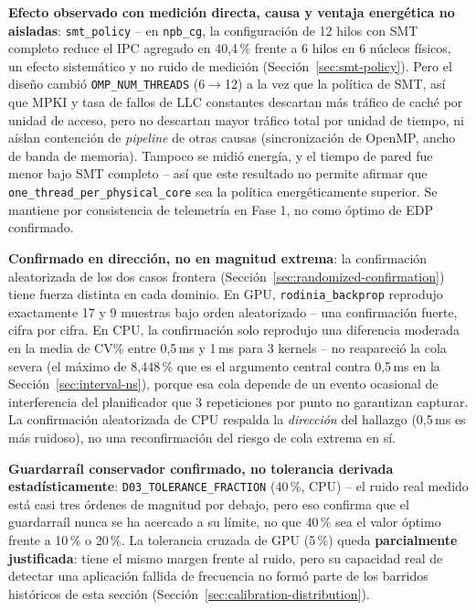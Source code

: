 \textbf{Efecto observado con medición directa, causa y ventaja energética
no aisladas}: \texttt{smt\_policy} -- en \texttt{npb\_cg}, la
configuración de 12 hilos con SMT completo reduce el IPC agregado en
40{,}4\,\% frente a 6 hilos en 6 núcleos físicos, un efecto sistemático y
no ruido de medición (Sección~\ref{sec:smt-policy}). Pero el diseño cambió
\texttt{OMP\_NUM\_THREADS} (6$\to$12) a la vez que la política de SMT, así
que MPKI y tasa de fallos de LLC constantes descartan más tráfico de caché
por unidad de acceso, pero no descartan mayor tráfico total por unidad de
tiempo, ni aíslan contención de \textit{pipeline} de otras causas
(sincronización de OpenMP, ancho de banda de memoria). Tampoco se midió
energía, y el tiempo de pared fue menor bajo SMT completo -- así que este
resultado no permite afirmar que \texttt{one\_thread\_per\_physical\_core}
sea la política energéticamente superior. Se mantiene por consistencia de
telemetría en Fase 1, no como óptimo de EDP confirmado.

\textbf{Confirmado en dirección, no en magnitud extrema}: la confirmación
aleatorizada de los dos casos frontera (Sección~\ref{sec:randomized-confirmation})
tiene fuerza distinta en cada dominio. En GPU, \texttt{rodinia\_backprop}
reprodujo exactamente 17 y 9 muestras bajo orden aleatorizado -- una
confirmación fuerte, cifra por cifra. En CPU, la confirmación solo
reprodujo una diferencia moderada en la media de CV\% entre 0{,}5\,ms y
1\,ms para 3 kernels -- no reapareció la cola severa (el máximo de
8{,}448\,\% que es el argumento central contra 0{,}5\,ms en la
Sección~\ref{sec:interval-ns}), porque esa cola depende de un evento
ocasional de interferencia del planificador que 3 repeticiones por punto
no garantizan capturar. La confirmación aleatorizada de CPU respalda la
\emph{dirección} del hallazgo (0{,}5\,ms es más ruidoso), no una
reconfirmación del riesgo de cola extrema en sí.

\textbf{Guardarraíl conservador confirmado, no tolerancia derivada
estadísticamente}: \texttt{D03\_TOLERANCE\_FRACTION} (40\,\%, CPU) -- el
ruido real medido está casi tres órdenes de magnitud por debajo, pero eso
confirma que el guardarraíl nunca se ha acercado a su límite, no que 40\,\%
sea el valor óptimo frente a 10\,\% o 20\,\%. La tolerancia cruzada de GPU
(5\,\%) queda \textbf{parcialmente justificada}: tiene el mismo margen
frente al ruido, pero su capacidad real de detectar una aplicación fallida
de frecuencia no formó parte de los barridos históricos de esta sección
(Sección~\ref{sec:calibration-distribution}).

